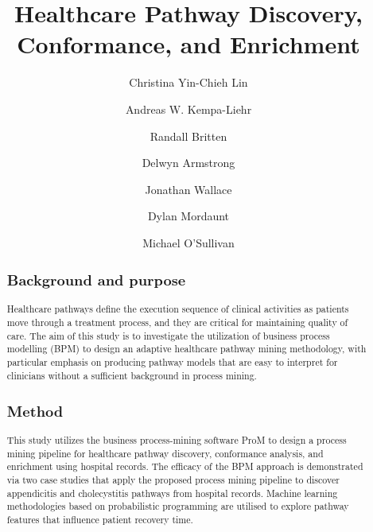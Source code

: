 \documentclass{elsarticle}
\newcommand{\wordcount}[2]{%
  (\immediate\write18{texcount -1 -sum -merge #1.tex > #1-words.sum }%
  /#2 words)%
}
\begin{document}
\newcommand{\plugin}[1]{\texttt{#1}}
\begin{frontmatter}

\title{Healthcare Pathway Discovery, Conformance, and Enrichment}


\author[mymainaddress]{Christina Yin-Chieh Lin}
\author[mymainaddress]{Andreas W. Kempa-Liehr}
\author[ADHB,Orion]{Randall Britten}
\author[Waitemata]{Delwyn Armstrong}
\author[Waitemata]{Jonathan Wallace}
\author[Adelaide,wasWaitemata]{Dylan Mordaunt}
\author[mymainaddress]{Michael O'Sullivan}

\address[mymainaddress]{Department of Engineering Science, The University of Auckland, 70 Symonds St, Auckland, New Zealand}
\address[ADHB]{Auckland District Health Board, 2 Park Road, Auckland, New Zealand}
\address[Orion]{was at Orion Health, 181 Grafton Rd, Auckland, New Zealand}

\address[Waitemata]{Waitemata District Health Board, 124 Shakespeare Rd, Auckland, New Zealand
}
\address[Adelaide]{University of Adelaide and Flinders University, Adelaide, Australia}
\address[wasWaitemata]{was at Waitemata District Health Board, 124 Shakespeare Rd, Auckland, New Zealand
}

\begin{abstract}
\subsection*{Background and purpose}
Healthcare pathways define the execution sequence of clinical activities as patients move through a treatment process, and they are critical for maintaining quality of care. The aim of this study is to investigate the utilization of business process modelling (BPM) to design an adaptive healthcare pathway mining methodology, with particular emphasis on producing pathway models that are easy to interpret for clinicians without a sufficient background in process mining.

\subsection*{Method}
This study utilizes the business process-mining software ProM to design a process mining pipeline for healthcare pathway discovery, conformance analysis, and enrichment using hospital records. The efficacy of the BPM approach is demonstrated via two case studies that apply the proposed process mining pipeline to discover appendicitis and cholecystitis 
pathways from hospital records. Machine learning methodologies based on probabilistic programming are utilised to explore pathway features that influence patient recovery time.


\end{abstract}
\end{frontmatter}
\end{document}
